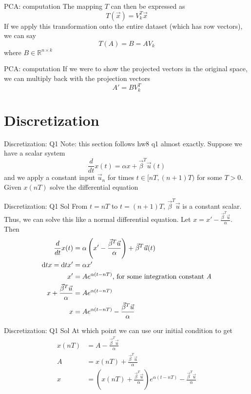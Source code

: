 \documentclass{beamer}
\begin{document}
	\begin{frame}{PCA: computation}
	The mapping $T$ can then be expressed as
	\[ T(\vec{x}) = V_k^T \vec{x} \]
	If we apply this transformation onto the entire dataset (which has row vectors), we can say
	\[ T(A) = B = A V_k \]
	where $B \in \mathbb{R}^{n \times k}$
	\end{frame}
	\begin{frame}{PCA: computation}
	If we were to show the projected vectors in the original space, we can multiply back with the projection vectors
	\[ A' = B V_k^T \]
	\end{frame}

	\section{Discretization}
	
	\begin{frame}{Discretization: Q1}
	Note: this section follows hw8 q1 almost exactly. Suppose we have a scalar system
	\[ \frac{d}{dt} x(t) = \alpha x + \vec{\beta}^T \vec u(t) \]
	and we apply a constant input $\vec{u}_n$ for times $t \in [nT, (n + 1)T)$ for some $T > 0$. Given $x(nT)$ solve the differential equation
	\end{frame}
    
    \begin{frame}{Discretization: Q1 Sol}
	From $t = nT$ to $t = (n + 1)T$, $\vec{\beta}^T \vec{u}$ is a constant scalar. Thus, we can solve this like a normal differential equation. Let $x = x' - \frac{\vec \beta^T \vec u}{\alpha}$. Then
	\begin{align*}
	\frac{d}{dt} x(t) &= \alpha \left(x' - \frac{\vec \beta^T \vec u}{\alpha}\right) + \vec{\beta}^T \vec u(t) \\
    \mathrm d{t}x = \mathrm d{t}x' &= \alpha x' \\
    x' &= A e^{\alpha (t - nT)} \text{, for some integration constant \em{A}} \\
	x + \frac{\vec \beta^T \vec u}{\alpha} &= A e^{\alpha (t - nT)} \\
	x &= A e^{\alpha (t - nT)} - \frac{\vec \beta^T \vec u}{\alpha}
	\end{align*}
\end{frame}
\begin{frame}{Discretization: Q1 Sol}
	At which point we can use our initial condition to get
	\begin{align*}
	x(nT) &= A - \frac{\vec \beta^T \vec u}{\alpha} \\
	A &= x(nT) + \frac{\vec \beta^T \vec u}{\alpha} \\
	x &= \left( x(nT) + \frac{\vec \beta^T \vec u}{\alpha} \right) e^{\alpha (t - nT)} - \frac{\vec \beta^T \vec u}{\alpha}
	\end{align*}
	\end{frame}
    
\end{document}
